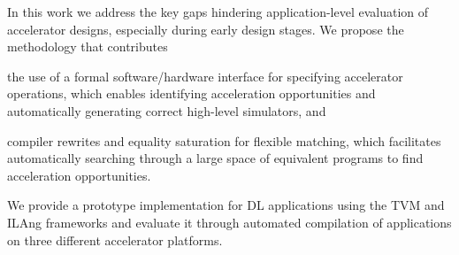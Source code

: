 In this work we address the key gaps %
hindering
application-level evaluation of accelerator designs, especially during early design stages.
We propose the \TLA methodology that contributes 
\begin{inlinelist}
\item the use of a formal software/hardware interface for specifying accelerator operations,
which enables identifying acceleration opportunities and automatically generating correct high-level simulators, and 
\item compiler rewrites and equality saturation for flexible matching, which 
facilitates automatically searching through a large space of equivalent programs to find %
acceleration opportunities. %
\end{inlinelist}
%
We provide a \TLA prototype implementation for DL applications using the TVM 
and ILAng frameworks
and evaluate it %
through automated compilation of \AppNum applications on three different accelerator platforms. 
